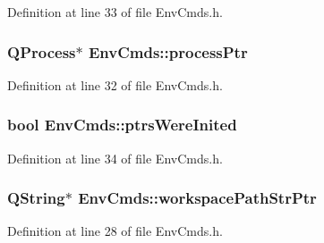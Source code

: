 Definition at line 33 of file Env\-Cmds.\-h.

\hypertarget{namespace_env_cmds_a21da1e15b7b37e13c140f4b6ed5b2c19}{
\subsubsection[{process\-Ptr}]{\setlength{\rightskip}{0pt plus 5cm}Q\-Process$\ast$ Env\-Cmds\-::process\-Ptr}}\label{namespace_env_cmds_a21da1e15b7b37e13c140f4b6ed5b2c19}


Definition at line 32 of file Env\-Cmds.\-h.

\hypertarget{namespace_env_cmds_a7852f7748db59a9b441595f3aac2474b}{
\subsubsection[{ptrs\-Were\-Inited}]{\setlength{\rightskip}{0pt plus 5cm}bool Env\-Cmds\-::ptrs\-Were\-Inited}}\label{namespace_env_cmds_a7852f7748db59a9b441595f3aac2474b}


Definition at line 34 of file Env\-Cmds.\-h.

\hypertarget{namespace_env_cmds_a18605d075c04e64885b1150b7e248976}{
\subsubsection[{workspace\-Path\-Str\-Ptr}]{\setlength{\rightskip}{0pt plus 5cm}Q\-String$\ast$ Env\-Cmds\-::workspace\-Path\-Str\-Ptr}}\label{namespace_env_cmds_a18605d075c04e64885b1150b7e248976}


Definition at line 28 of file Env\-Cmds.\-h.

